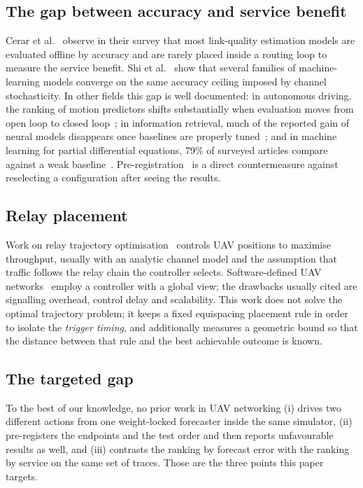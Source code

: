 \subsection{The gap between accuracy and service benefit}
Cerar et al.~\cite{cerar} observe in their survey that most link-quality
estimation models are evaluated offline by accuracy and are rarely placed
inside a routing loop to measure the service benefit. Shi et al.~\cite{shi2024}
show that several families of machine-learning models converge on the same
accuracy ceiling imposed by channel stochasticity. In other fields this gap is
well documented: in autonomous driving, the ranking of motion predictors shifts
substantially when evaluation moves from open loop to closed
loop~\cite{closedloop2025}; in information retrieval, much of the reported gain
of neural models disappears once baselines are properly tuned~\cite{lin2018};
and in machine learning for partial differential equations, 79\% of surveyed
articles compare against a weak baseline~\cite{mcgreivy2024}.
Pre-registration~\cite{nosek} is a direct countermeasure against reselecting a
configuration after seeing the results.

\subsection{Relay placement}
Work on relay trajectory optimisation~\cite{zeng2016} controls UAV positions to
maximise throughput, usually with an analytic channel model and the assumption
that traffic follows the relay chain the controller selects. Software-defined
UAV networks~\cite{abir} employ a controller with a global view; the drawbacks
usually cited are signalling overhead, control delay and scalability. This work
does not solve the optimal trajectory problem; it keeps a fixed equispacing
placement rule in order to isolate the \emph{trigger timing}, and additionally
measures a geometric bound so that the distance between that rule and the best
achievable outcome is known.

\subsection{The targeted gap}
To the best of our knowledge, no prior work in UAV networking (i) drives two
different actions from one weight-locked forecaster inside the same simulator,
(ii) pre-registers the endpoints and the test order and then reports
unfavourable results as well, and (iii) contrasts the ranking by forecast error
with the ranking by service on the same set of traces. Those are the three
points this paper targets.
